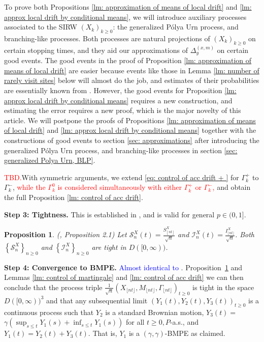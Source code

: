\documentclass[twoside,12pt,a4paper]{article}
\newtheorem{proposition}{Proposition}[section]
\numberwithin{equation}{section}
\newcommand\TBD{\textcolor{red}{TBD.}}
\newcommand{\edt}[1]{\textcolor{red}{#1}} %
\newcommand{\comment}[1]{\textcolor{blue}{#1}}
\begin{document}
	To prove both Propositions \ref{lm: approximation of means of local drift} and \ref{lm: approx local drift by conditional means}, we will introduce auxiliary processes associated to the SIRW $(X_k)_{k\geq 0}$: the generalized P\'{o}lya Urn process, and branching-like processes. Both processes are natural projections of $(X_k)_{k\geq 0}$ on certain stopping times, and they aid our approximations of $\Delta_{y}^{(x,m)}$ on certain good events. The good events in the proof of Proposition \ref{lm: approximation of means of local drift} are easier because events like those in Lemma \ref{lm: number of rarely visit sites} below will almost do the job, and estimates of their probabilities are essentially known from \cite{KMP22}. However, the good events for Proposition \ref{lm: approx local drift by conditional means} requires a new construction, and estimating the error requires a new proof, which is the major novelty of this article. We will postpone the proofs of Propositions \ref{lm: approximation of means of local drift} and \ref{lm: approx local drift by conditional means} together with the constructions of good events to section \ref{sec: approximations} after introducing the generalized P\'{o}lya Urn process, and branching-like processes in section \ref{sec: generalized Polya Urn, BLP}.
	
	\TBD With symmetric arguments, we extend \eqref{eq: control of acc drift + } for $\Gamma_k^+$ to $\Gamma_k^-$, \edt{while the $\Gamma_k^0$ is considered simultaneously with either $\Gamma_k^+$ or $\Gamma_k^-$,} and obtain the full Proposition \ref{lm: control of acc drift}.
	
	
	\textbf{Step 3: Tightness.} This is established in \cite{KMP22}, and is valid for general $p \in (0,1]$. 

	\begin{proposition}(\cite{KMP22}, Proposition 2.1)
		\label{prop: tightness}
		Let $\mathcal{S}_n^X(t)=\frac{S_{\left\lfloor n t \right\rfloor}^X}{\sqrt{n}}$ and $\mathcal{I}_n^X(t)=\frac{I_{\lfloor n t \rfloor}^X}{\sqrt{n}}$. Both $\left\{\mathcal{S}_n^X\right\}_{n \geq 0}$ and $\left\{\mathcal{I}_n^X\right\}_{n \geq 0}$ are tight in $D([0, \infty))$.
	\end{proposition}
	
	\textbf{Step 4: Convergence to BMPE.} 
	\comment{Almost identical to \cite{KMP22}}.
	Proposition~\ref{prop: tightness} and Lemmas \ref{lm: control of martingale} and \ref{lm: control of acc drift} we can then conclude that the process triple $\frac{1}{\sqrt{n}}\left(X_{\lfloor n t\rfloor}, M_{\lfloor n t\rfloor}, \Gamma_{\lfloor n t\rfloor}\right)_{t \geq 0}$ is tight in the space $D([0, \infty))^3$ and that any subsequential limit $\left(Y_1(t), Y_2(t), Y_3(t)\right)_{t \geq 0}$ is a continuous process such that $Y_2$ is a standard Brownian motion, $Y_3(t)=$ $\gamma\left(\sup _{s \leq t} Y_1(s)+\inf _{s \leq t} Y_1(s)\right)$ for all $t \geq 0, P$-a.s., and $Y_1(t)=Y_2(t)+Y_3(t)$. That is, $Y_1$ is a $(\gamma, \gamma)$-BMPE as claimed.
\end{document}
